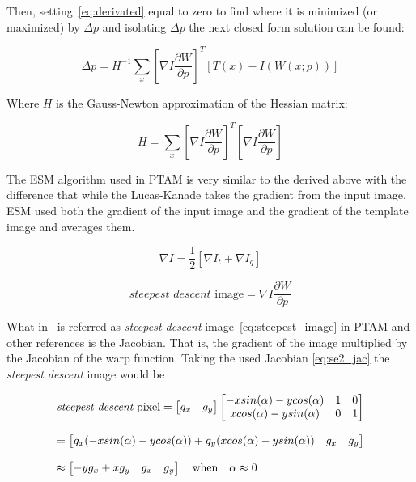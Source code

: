 Then, setting~\ref{eq:derivated} equal to zero to find where it is minimized (or maximized) by $\Delta p$ and isolating $\Delta p$ the next closed form solution can be found:

\begin{equation}
  \Delta p = H^{-1} \sum_x \left[\nabla I \frac{\partial W}{\partial p}\right]^T \left[ T(x) - I(W(x;p)) \right]
\end{equation}

Where $H$ is the Gauss-Newton approximation of the Hessian matrix:

\begin{equation}
  H = \sum_x \left[\nabla I \frac{\partial W}{\partial p}\right]^T \left[\nabla I \frac{\partial W}{\partial p}\right]
\end{equation}


The ESM algorithm used in PTAM is very similar to the derived above with the difference that while the Lucas-Kanade takes the gradient from the input image, ESM used both the gradient of the input image and the gradient of the template image and averages them.

\begin{equation}
  \nabla I = \frac{1}{2} \left[\nabla I_t + \nabla I_q \right]
\end{equation}

\begin{equation}
  \textit{steepest descent}\text{ image} = \nabla I \frac{\partial W}{\partial p}
  \label{eq:steepest_image}
\end{equation}

What in~\cite{Baker2004} is referred as \textit{steepest descent} image~\ref{eq:steepest_image} in PTAM and other references is the Jacobian. That is, the gradient of the image multiplied by the Jacobian of the warp function. Taking the used Jacobian \ref{eq:se2_jac} the \textit{steepest descent} image would be

\begin{equation}
  \begin{array}{l l}
  \textit{steepest descent}\text{ pixel} = \begin{bmatrix}  g_x & g_y \end{bmatrix} 
  \begin{bmatrix}
    -xsin(\alpha) - ycos(\alpha) & 1 & 0 \\
    xcos(\alpha) - ysin(\alpha) & 0 & 1 \\
  \end{bmatrix}
  \\ \\=
  \begin{bmatrix}
    g_x(-xsin(\alpha) - ycos(\alpha)) + g_y(xcos(\alpha) - ysin(\alpha)) & g_x & g_y
  \end{bmatrix}
  \\ \\
  \approx
  \begin{bmatrix}
    -y g_x + x g_y & g_x & g_y
  \end{bmatrix}
  \quad \text{when} \quad
  \alpha \approx 0
\end{array}
\end{equation}

